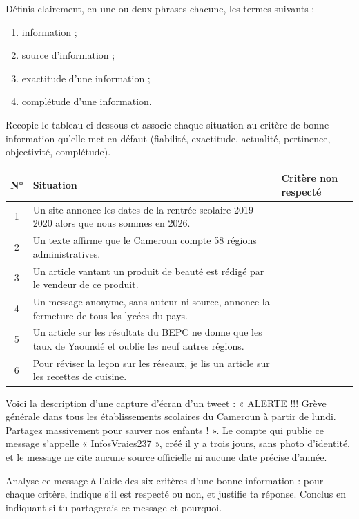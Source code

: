 \documentclass[11pt]{article}
\newcounter{popsec}
\newcounter{popsub}
\newcommand{\courssub}[1]{%
  \stepcounter{popsub}%
  \par\vspace{9pt}\noindent{\popxbold\fontsize{11.5}{13}\selectfont\color{popink}{\color{poporange}\thepopsec.\thepopsub}\hspace{6pt}#1}\par\nopagebreak\vspace{4pt}
}
\begin{document}
\begin{exercice}[Définitions]
Définis clairement, en une ou deux phrases chacune, les termes suivants :
\begin{enumerate}
\item information ;
\item source d'information ;
\item exactitude d'une information ;
\item complétude d'une information.
\end{enumerate}
\end{exercice}

\begin{exercice}
Recopie le tableau ci-dessous et associe chaque situation au critère de bonne information qu'elle met en défaut (fiabilité, exactitude, actualité, pertinence, objectivité, complétude).

\begin{center}
\begin{tabularx}{\linewidth}{|c|X|X|}
\hline
\rowcolor{popblueL} \textbf{N°} & \textbf{Situation} & \textbf{Critère non respecté} \\
\hline
1 & Un site annonce les dates de la rentrée scolaire 2019-2020 alors que nous sommes en 2026. & \\
\hline
2 & Un texte affirme que le Cameroun compte 58 régions administratives. & \\
\hline
3 & Un article vantant un produit de beauté est rédigé par le vendeur de ce produit. & \\
\hline
4 & Un message anonyme, sans auteur ni source, annonce la fermeture de tous les lycées du pays. & \\
\hline
5 & Un article sur les résultats du BEPC ne donne que les taux de Yaoundé et oublie les neuf autres régions. & \\
\hline
6 & Pour réviser la leçon sur les réseaux, je lis un article sur les recettes de cuisine. & \\
\hline
\end{tabularx}
\end{center}
\end{exercice}

\courssub{Je m'entraîne}

\begin{exercice}
Voici la description d'une capture d'écran d'un tweet : « ALERTE !!! Grève générale dans tous les établissements scolaires du Cameroun à partir de lundi. Partagez massivement pour sauver nos enfants ! ». Le compte qui publie ce message s'appelle « InfosVraies237 », créé il y a trois jours, sans photo d'identité, et le message ne cite aucune source officielle ni aucune date précise d'année.

Analyse ce message à l'aide des six critères d'une bonne information : pour chaque critère, indique s'il est respecté ou non, et justifie ta réponse. Conclus en indiquant si tu partagerais ce message et pourquoi.
\end{exercice}
\end{document}
